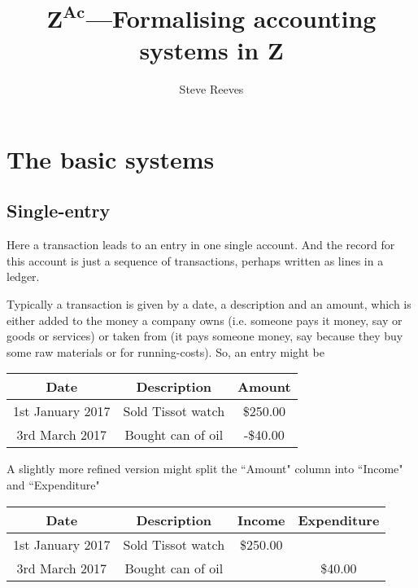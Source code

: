 \documentclass[11pt]{amsart}
\title{$\mathbf{Z^{Ac}}$---Formalising accounting systems in Z}
\author{Steve Reeves}
\date{}                                           %
\begin{document}
\maketitle

\section{The basic systems}

\subsection{Single-entry}\label{singlebasic}

Here a transaction leads to an entry in one single account. And the record for this account is just a sequence of transactions, perhaps written as lines in a ledger. 

Typically a transaction is given by a date, a description and an amount, which is either added to the money a company owns (i.e. someone pays it money, say or goods or services) or taken from (it pays someone money, say because they buy some raw materials or for running-costs). So, an entry might be

\begin{table}[h]
\begin{center}
\begin{tabular}{|c|c|c|}
Date & Description & Amount \\
\hline \hline
1st January 2017 & Sold Tissot watch & \$250.00\\
\hline
3rd March 2017 &  Bought can of oil & -\$40.00
\end{tabular}
\end{center}
\label{default}
\end{table}%

A slightly more refined version might split the ``Amount" column into ``Income" and ``Expenditure" 

\begin{table}[h]
\begin{center}
\begin{tabular}{|c|c|c|c|}
Date & Description & Income & Expenditure \\
\hline \hline
1st January 2017 & Sold Tissot watch & \$250.00 & \\
\hline
3rd March 2017 &  Bought can of oil & & \$40.00
\end{tabular}
\end{center}
\label{default}
\end{table}%
\end{document}
